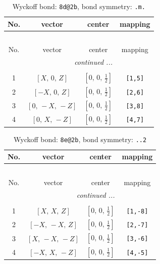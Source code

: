 \documentclass[fleqn,8pt]{jsarticle}
\begin{document}
\begin{longtable}{cccc}
\caption{Wyckoff bond: {\tt 8d@2b}, bond symmetry: {\tt .m.}}
 \\
 \hline \hline
No. & vector & center & mapping \\ \hline \endfirsthead

\multicolumn{3}{l}{\tablename\ \thetable{}} \\
 \hline \hline
No. & vector & center & mapping \\ \hline \endhead

 \hline \hline
\multicolumn{3}{r}{\footnotesize\it continued ...} \\ \endfoot

 \hline \hline
\multicolumn{3}{r}{} \\ \endlastfoot

1 & $\left[ X,\, 0,\, Z \right]$ & $\left[ 0,\, 0,\, \frac{1}{2} \right]$ & {\tt [1,5]} \\ \hline
2 & $\left[ - X,\, 0,\, Z \right]$ & $\left[ 0,\, 0,\, \frac{1}{2} \right]$ & {\tt [2,6]} \\ \hline
3 & $\left[ 0,\, - X,\, - Z \right]$ & $\left[ 0,\, 0,\, \frac{1}{2} \right]$ & {\tt [3,8]} \\ \hline
4 & $\left[ 0,\, X,\, - Z \right]$ & $\left[ 0,\, 0,\, \frac{1}{2} \right]$ & {\tt [4,7]} \\
\end{longtable}
\renewcommand{\arraystretch}{1.2}
\begin{longtable}{cccc}
\caption{Wyckoff bond: {\tt 8e@2b}, bond symmetry: {\tt ..2}}
 \\
 \hline \hline
No. & vector & center & mapping \\ \hline \endfirsthead

\multicolumn{3}{l}{\tablename\ \thetable{}} \\
 \hline \hline
No. & vector & center & mapping \\ \hline \endhead

 \hline \hline
\multicolumn{3}{r}{\footnotesize\it continued ...} \\ \endfoot

 \hline \hline
\multicolumn{3}{r}{} \\ \endlastfoot

1 & $\left[ X,\, X,\, Z \right]$ & $\left[ 0,\, 0,\, \frac{1}{2} \right]$ & {\tt [1,-8]} \\ \hline
2 & $\left[ - X,\, - X,\, Z \right]$ & $\left[ 0,\, 0,\, \frac{1}{2} \right]$ & {\tt [2,-7]} \\ \hline
3 & $\left[ X,\, - X,\, - Z \right]$ & $\left[ 0,\, 0,\, \frac{1}{2} \right]$ & {\tt [3,-6]} \\ \hline
4 & $\left[ - X,\, X,\, - Z \right]$ & $\left[ 0,\, 0,\, \frac{1}{2} \right]$ & {\tt [4,-5]} \\
\end{longtable}
\end{document}
